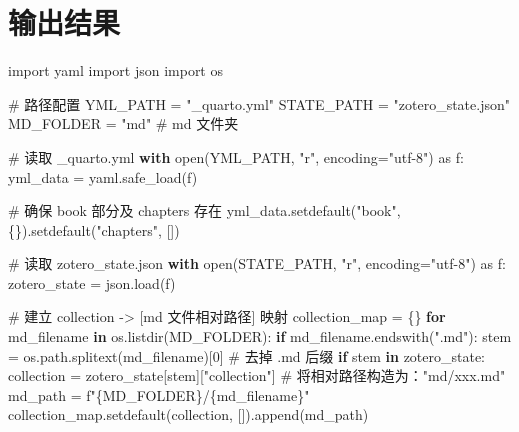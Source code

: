 \documentclass[
  letterpaper,
  DIV=11,
  numbers=noendperiod]{scrreprt}
\newenvironment{Shaded}{\begin{snugshade}}{\end{snugshade}}
\newcommand{\BuiltInTok}[1]{\textcolor[rgb]{0.00,0.23,0.31}{#1}}
\newcommand{\CommentTok}[1]{\textcolor[rgb]{0.37,0.37,0.37}{#1}}
\newcommand{\ControlFlowTok}[1]{\textcolor[rgb]{0.00,0.23,0.31}{\textbf{#1}}}
\newcommand{\DecValTok}[1]{\textcolor[rgb]{0.68,0.00,0.00}{#1}}
\newcommand{\ImportTok}[1]{\textcolor[rgb]{0.00,0.46,0.62}{#1}}
\newcommand{\KeywordTok}[1]{\textcolor[rgb]{0.00,0.23,0.31}{\textbf{#1}}}
\newcommand{\NormalTok}[1]{\textcolor[rgb]{0.00,0.23,0.31}{#1}}
\newcommand{\OperatorTok}[1]{\textcolor[rgb]{0.37,0.37,0.37}{#1}}
\newcommand{\SpecialCharTok}[1]{\textcolor[rgb]{0.37,0.37,0.37}{#1}}
\newcommand{\SpecialStringTok}[1]{\textcolor[rgb]{0.13,0.47,0.30}{#1}}
\newcommand{\StringTok}[1]{\textcolor[rgb]{0.13,0.47,0.30}{#1}}
\begin{document}
\section{输出结果}\label{ux8f93ux51faux7ed3ux679c}

\begin{Shaded}
\begin{Highlighting}[]
\ImportTok{import}\NormalTok{ yaml}
\ImportTok{import}\NormalTok{ json}
\ImportTok{import}\NormalTok{ os}

\CommentTok{\# 路径配置}
\NormalTok{YML\_PATH }\OperatorTok{=} \StringTok{"\_quarto.yml"}
\NormalTok{STATE\_PATH }\OperatorTok{=} \StringTok{"zotero\_state.json"}
\NormalTok{MD\_FOLDER }\OperatorTok{=} \StringTok{"md"}  \CommentTok{\# md 文件夹}

\CommentTok{\# 读取 \_quarto.yml}
\ControlFlowTok{with} \BuiltInTok{open}\NormalTok{(YML\_PATH, }\StringTok{"r"}\NormalTok{, encoding}\OperatorTok{=}\StringTok{"utf{-}8"}\NormalTok{) }\ImportTok{as}\NormalTok{ f:}
\NormalTok{    yml\_data }\OperatorTok{=}\NormalTok{ yaml.safe\_load(f)}

\CommentTok{\# 确保 book 部分及 chapters 存在}
\NormalTok{yml\_data.setdefault(}\StringTok{"book"}\NormalTok{, \{\}).setdefault(}\StringTok{"chapters"}\NormalTok{, [])}

\CommentTok{\# 读取 zotero\_state.json}
\ControlFlowTok{with} \BuiltInTok{open}\NormalTok{(STATE\_PATH, }\StringTok{"r"}\NormalTok{, encoding}\OperatorTok{=}\StringTok{"utf{-}8"}\NormalTok{) }\ImportTok{as}\NormalTok{ f:}
\NormalTok{    zotero\_state }\OperatorTok{=}\NormalTok{ json.load(f)}

\CommentTok{\# 建立 collection {-}\textgreater{} [md 文件相对路径] 映射}
\NormalTok{collection\_map }\OperatorTok{=}\NormalTok{ \{\}}
\ControlFlowTok{for}\NormalTok{ md\_filename }\KeywordTok{in}\NormalTok{ os.listdir(MD\_FOLDER):}
    \ControlFlowTok{if}\NormalTok{ md\_filename.endswith(}\StringTok{".md"}\NormalTok{):}
\NormalTok{        stem }\OperatorTok{=}\NormalTok{ os.path.splitext(md\_filename)[}\DecValTok{0}\NormalTok{]  }\CommentTok{\# 去掉 .md 后缀}
        \ControlFlowTok{if}\NormalTok{ stem }\KeywordTok{in}\NormalTok{ zotero\_state:}
\NormalTok{            collection }\OperatorTok{=}\NormalTok{ zotero\_state[stem][}\StringTok{"collection"}\NormalTok{]}
            \CommentTok{\# 将相对路径构造为："md/xxx.md"}
\NormalTok{            md\_path }\OperatorTok{=} \SpecialStringTok{f"}\SpecialCharTok{\{}\NormalTok{MD\_FOLDER}\SpecialCharTok{\}}\SpecialStringTok{/}\SpecialCharTok{\{}\NormalTok{md\_filename}\SpecialCharTok{\}}\SpecialStringTok{"}
\NormalTok{            collection\_map.setdefault(collection, []).append(md\_path)}


\end{Highlighting}
\end{Shaded}
\end{document}
